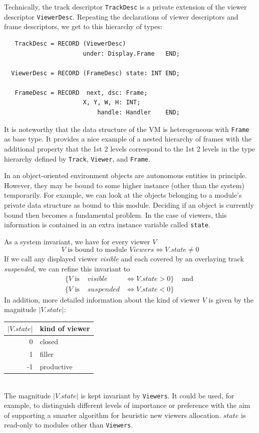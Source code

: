 Technically, the track descriptor \verb|TrackDesc| is a private extension
of the viewer descriptor \verb|ViewerDesc|.
Repeating the declarations of viewer descriptors and frame descriptors,
we get to this hierarchy of types:
\begin{verbatim}
   TrackDesc = RECORD (ViewerDesc)
                      under: Display.Frame   END;

  ViewerDesc = RECORD (FrameDesc) state: INT END;

   FrameDesc = RECORD  next, dsc: Frame;
                      X, Y, W, H: INT;
                          handle: Handler    END;
\end{verbatim}

It is noteworthy that the data structure of the VM is heterogeneous with \verb|Frame| as base type.
It provides a nice example of a nested hierarchy of frames with the additional property
that the 1st 2 levels correspond to the 1st 2 levels in the type hierarchy defined by
\verb|Track|, \verb|Viewer|, and \verb|Frame|.

In an object-oriented environment objects are autonomous entities in principle.  However,
they may be bound to some higher instance (other than the system) temporarily.  For example,
we can look at the objects belonging to a module's private data structure as bound to this module.
Deciding if an object is currently bound then becomes a fundamental problem.  In the case of viewers,
this information is contained in an extra instance variable called \verb|state|.

As a system invariant, we have for every viewer $V$
\[ V\text{ is bound to module }Viewers \Leftrightarrow V.state \neq 0 \]
If we call any displayed viewer \emph{visible} and
each covered by an overlaying track \emph{suspended}, we can refine this invariant to
\begin{align*}
\{V\text{ is }&  visible\!\!\!\!\!\!\!\!\!\!\!\!\!\!\!\!\!\!\!\!\!\!\!\!\!\!\!&\Leftrightarrow V.state > 0\}&\text{ and }\\
\{V\text{ is }&suspended\!\!\!\!\!\!\!\!\!\!\!\!\!\!\!\!\!\!\!\!\!\!\!\!\!\!\!&\Leftrightarrow V.state < 0\}&
\end{align*}
In addition,
more detailed information about the kind of viewer $V$ is given by the magnitude $|V.state|$:
\begin{table}[h!]
  \centering
  \begin{tabular}{r l}
    $|V.state|$ & kind of viewer \\\hline
              0 & closed \\
              1 & filler \\
             -1 & productive
  \end{tabular}
\end{table}
\\The magnitude $|V.state|$ is kept invariant by \verb|Viewers|.
It could be used, for example, to distinguish different levels of importance or preference
with the aim of supporting a smarter algorithm for heuristic new viewers allocation.
$state$ is read-only to modules other than \verb|Viewers|.

